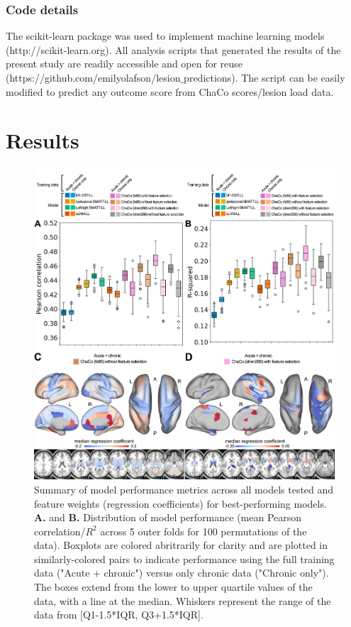\documentclass[10pt]{article}
\def\Plus{\texttt{+}}
\begin{document}
\subsubsection*{Code details}
The scikit-learn package was used to implement machine learning models (http://scikit-learn.org). All analysis scripts that generated the results of the present study are readily accessible and open for reuse (https://github.com/emilyolafson/lesion$\_$predictions). The script can be easily modified to predict any outcome score from ChaCo scores/lesion load data.

\section{Results}


\begin{figure}[htp]
\centering
\includegraphics[width=1\linewidth]{figures/Analysis1.png}
\caption{Summary of model performance metrics across all models tested and feature weights (regression coefficients) for best-performing models.  \textbf{A.} and \textbf{B.} Distribution of model performance (mean Pearson correlation/$R^2$ across 5 outer folds for 100 permutations of the data).  Boxplots are colored abritrarily for clarity and are plotted in similarly-colored pairs to indicate performance using the full training data ("Acute $\Plus$  chronic") versus only chronic data ("Chronic only"). The boxes extend from the lower to upper quartile values of the data, with a line at the median. Whiskers represent the range of the data from [Q1-1.5*IQR, Q3+1.5*IQR].
}
\end{figure}
\end{document}
